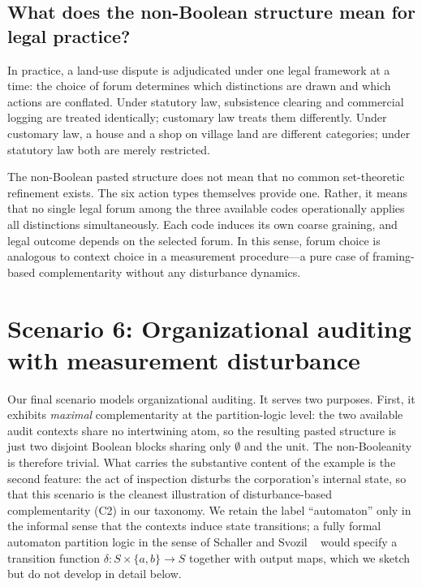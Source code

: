\documentclass[aps,pra,twocolumn,superscriptaddress,floatfix,longbibliography]{revtex4-2}
\begin{document}
\subsection{What does the non-Boolean structure mean for legal practice?}

In practice, a land-use dispute is adjudicated under one legal
framework at a time: the choice of forum determines which distinctions
are drawn and which actions are conflated. Under statutory law,
subsistence clearing and commercial logging are treated identically;
customary law treats them differently. Under customary law, a house
and a shop on village land are different categories; under statutory
law both are merely restricted.

The non-Boolean pasted structure does not mean that no common
set-theoretic refinement exists. The six action types themselves
provide one. Rather, it means that no single legal forum among the
three available codes operationally applies all distinctions
simultaneously. Each code induces its own coarse graining, and legal
outcome depends on the selected forum. In this sense, forum choice is
analogous to context choice in a measurement procedure---a pure case
of framing-based complementarity without any disturbance dynamics.

\section{Scenario 6: Organizational auditing with measurement
disturbance}
\label{sec:org}

Our final scenario models organizational auditing. It serves two
purposes. First, it exhibits \emph{maximal} complementarity at the
partition-logic level: the two available audit contexts share no
intertwining atom, so the resulting pasted structure is just two
disjoint Boolean blocks sharing only $\emptyset$ and the unit. The
non-Booleanity is therefore trivial. What carries the substantive
content of the example is the second feature: the act of inspection
disturbs the corporation's internal state, so that this scenario is
the cleanest illustration of disturbance-based complementarity (C2)
in our taxonomy. We retain the label ``automaton'' only in the
informal sense that the contexts induce state transitions; a fully
formal automaton partition logic in the sense of Schaller and Svozil
~\cite{schaller-92,svozil-2001-eua} would specify a transition
function $\delta\colon S\times\{a,b\}\to S$ together with output
maps, which we sketch but do not develop in detail below.
\end{document}
